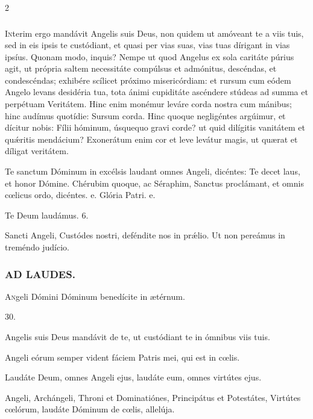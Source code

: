 \documentclass[9pt,twoside]{extarticle}
\begin{document}
\begin{multicols}{2}
\subsubsection*{\center {}}
\lettrine{I}nterim ergo mandávit Angelis suis Deus, non quidem ut amóveant te a viis tuis, sed in eis ipsis te custódiant, et quasi per vias suas, vias tuas dírigant in vias ipsíus. Quonam modo, inquis? Nempe ut quod Angelus ex sola caritáte púrius agit, ut própria saltem necessitáte compúlsus et admónitus, descéndas, et condescéndas; exhibére scílicet próximo misericórdiam: et rursum cum eódem Angelo levans desidéria tua, tota ánimi cupiditáte ascéndere stúdeas ad summa et perpétuam Veritátem. Hinc enim monémur leváre corda nostra cum mánibus; hinc audímus quotídie: Sursum corda. Hinc quoque negligéntes argúimur, et dícitur nobis: Fílii hóminum, úsquequo gravi corde? ut quid dilígitis vanitátem et quǽritis mendácium? Exonerátum enim cor et leve levátur magis, ut quærat et díligat veritátem.

\begin{tightlist}{}
\item {} Te sanctum Dóminum in excélsis laudant omnes Angeli, dicéntes: \textred{*} Te decet laus, et honor Dómine.  Chérubim quoque, ac Séraphim, Sanctus proclámant, et omnis cœlicus ordo, dicéntes. e. Glória Patri. e.
\item Te Deum laudámus. 6.
\item {} Sancti Angeli, Custódes nostri, deféndite nos in prǽlio.  Ut non pereámus in treméndo judício.
\end{tightlist}

\subsubsection*{\center \textsc{AD LAUDES.}}
\begin{center}\end{center}
\lettrine{A}ngeli Dómini Dóminum benedícite in ætérnum.

\begin{tightlist}{}
\item {} 30.
\item {} Angelis suis Deus mandávit de te, ut custódiant te in ómnibus viis tuis.
\item {} Angeli eórum semper vident fáciem Patris mei, qui est in cœlis.
\item {} Laudáte Deum, omnes Angeli ejus, laudáte eum, omnes virtútes ejus.
\item {} Angeli, Archángeli, Throni et Dominatiónes, Principátus et Potestátes, Virtútes cœlórum, laudáte Dóminum de cœlis, allelúja.
\end{tightlist}


\end{multicols}
\end{document}
